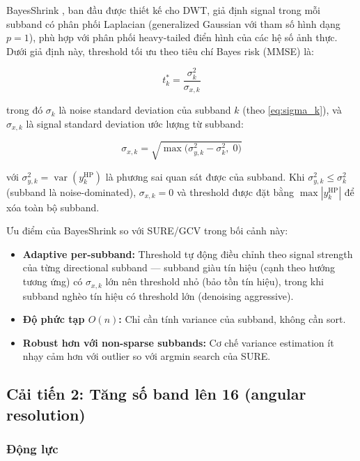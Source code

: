 BayesShrink \cite{chang2000}, ban đầu được thiết kế cho DWT, giả định signal trong mỗi subband có phân phối Laplacian (generalized Gaussian với tham số hình dạng $p = 1$), phù hợp với phân phối heavy-tailed điển hình của các hệ số ảnh thực. Dưới giả định này, threshold tối ưu theo tiêu chí Bayes risk (MMSE) là:

\begin{equation}
    t_k^* = \frac{\sigma_k^2}{\sigma_{x,k}}
    \label{eq:bayes_dfb}
\end{equation}

trong đó $\sigma_k$ là noise standard deviation của subband $k$ (theo \eqref{eq:sigma_k}), và $\sigma_{x,k}$ là signal standard deviation ước lượng từ subband:

\begin{equation}
    \sigma_{x,k} = \sqrt{\max\!\bigl(\sigma_{y,k}^2 - \sigma_k^2,\; 0\bigr)}
    \label{eq:sigma_x}
\end{equation}

với $\sigma_{y,k}^2 = \operatorname{var}(y_k^{\text{HP}})$ là phương sai quan sát được của subband. Khi $\sigma_{y,k}^2 \leq \sigma_k^2$ (subband là noise-dominated), $\sigma_{x,k} = 0$ và threshold được đặt bằng $\max|y_k^{\text{HP}}|$ để xóa toàn bộ subband.

Ưu điểm của BayesShrink so với SURE/GCV trong bối cảnh này:
\begin{itemize}
    \item \textbf{Adaptive per-subband:} Threshold tự động điều chỉnh theo signal strength của từng directional subband --- subband giàu tín hiệu (cạnh theo hướng tương ứng) có $\sigma_{x,k}$ lớn nên threshold nhỏ (bảo tồn tín hiệu), trong khi subband nghèo tín hiệu có threshold lớn (denoising aggressive).
    \item \textbf{Độ phức tạp $O(n)$:} Chỉ cần tính variance của subband, không cần sort.
    \item \textbf{Robust hơn với non-sparse subbands:} Cơ chế variance estimation ít nhạy cảm hơn với outlier so với argmin search của SURE.
\end{itemize}

\subsection{Cải tiến 2: Tăng số band lên 16 (angular resolution)}
\label{subsec:improve_16band}

\subsubsection{Động lực}

